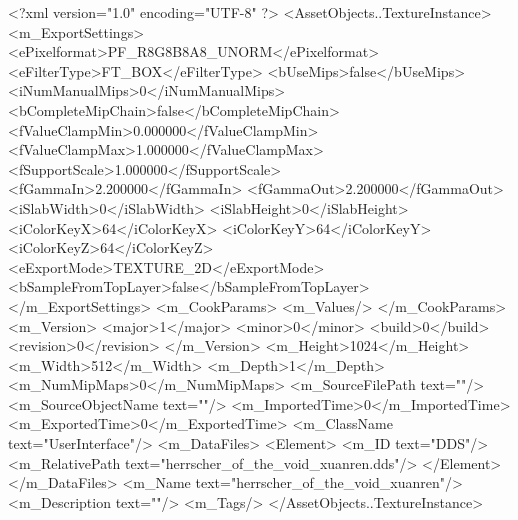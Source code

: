 <?xml version="1.0" encoding="UTF-8" ?>
<AssetObjects..TextureInstance>
	<m_ExportSettings>
		<ePixelformat>PF_R8G8B8A8_UNORM</ePixelformat>
		<eFilterType>FT_BOX</eFilterType>
		<bUseMips>false</bUseMips>
		<iNumManualMips>0</iNumManualMips>
		<bCompleteMipChain>false</bCompleteMipChain>
		<fValueClampMin>0.000000</fValueClampMin>
		<fValueClampMax>1.000000</fValueClampMax>
		<fSupportScale>1.000000</fSupportScale>
		<fGammaIn>2.200000</fGammaIn>
		<fGammaOut>2.200000</fGammaOut>
		<iSlabWidth>0</iSlabWidth>
		<iSlabHeight>0</iSlabHeight>
		<iColorKeyX>64</iColorKeyX>
		<iColorKeyY>64</iColorKeyY>
		<iColorKeyZ>64</iColorKeyZ>
		<eExportMode>TEXTURE_2D</eExportMode>
		<bSampleFromTopLayer>false</bSampleFromTopLayer>
	</m_ExportSettings>
	<m_CookParams>
		<m_Values/>
	</m_CookParams>
	<m_Version>
		<major>1</major>
		<minor>0</minor>
		<build>0</build>
		<revision>0</revision>
	</m_Version>
	<m_Height>1024</m_Height>
	<m_Width>512</m_Width>
	<m_Depth>1</m_Depth>
	<m_NumMipMaps>0</m_NumMipMaps>
	<m_SourceFilePath text=""/>
	<m_SourceObjectName text=""/>
	<m_ImportedTime>0</m_ImportedTime>
	<m_ExportedTime>0</m_ExportedTime>
	<m_ClassName text="UserInterface"/>
	<m_DataFiles>
		<Element>
			<m_ID text="DDS"/>
			<m_RelativePath text="herrscher_of_the_void_xuanren.dds"/>
		</Element>
	</m_DataFiles>
	<m_Name text="herrscher_of_the_void_xuanren"/>
	<m_Description text=""/>
	<m_Tags/>
</AssetObjects..TextureInstance>
